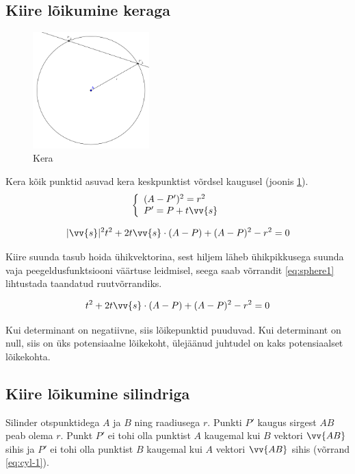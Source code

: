 \documentclass[a4paper,12pt]{report}
\renewcommand{\vec}[1]{\vv{#1}}
\begin{document}
\subsection{Kiire lõikumine keraga}
\begin{figure}
\includegraphics[width=0.4\textwidth]{sphere}
\caption{Kera}
\label{fig:sphere}
\end{figure}
Kera kõik punktid asuvad kera keskpunktist võrdsel kaugusel (joonis \ref{fig:sphere}).
\begin{equation} 
\left\{
\begin{array}{l}
(A - P')^2 = r^2 \\
P' = P + t\vec s
\end{array}
\right.
\end{equation}

\begin{equation} \label{eq:sphere1}
|\vec s|^2 t^2 + 2 t \vec s \cdot (A-P) + (A-P)^2 - r^2 = 0
\end{equation}

Kiire suunda tasub hoida ühikvektorina, sest hiljem läheb ühikpikkusega
suunda vaja peegeldusfunktsiooni väärtuse leidmisel, seega saab võrrandit
\ref{eq:sphere1} lihtustada taandatud ruutvõrrandiks.

\begin{equation} \label{eq:sphere2}
t^2 + 2 t \vec s \cdot (A-P) + (A-P)^2 - r^2 = 0
\end{equation}

Kui determinant on negatiivne, siis lõikepunktid puuduvad. Kui determinant
on null, siis on üks potensiaalne lõikekoht, ülejäänud juhtudel on kaks
potensiaalset lõikekohta.

\subsection{Kiire lõikumine silindriga}
Silinder otspunktidega \(A\) ja \(B\) ning raadiusega \(r\). Punkti \(P'\) kaugus sirgest \(AB\)
peab olema \(r\). Punkt \(P'\) ei tohi olla punktist \(A\) kaugemal kui \(B\) vektori \(\vec{AB}\)
sihis ja \(P'\) ei tohi olla punktist \(B\) kaugemal kui \(A\) vektori \(\vec{AB}\) sihis (võrrand \ref{eq:cyl-1}).
\end{document}
